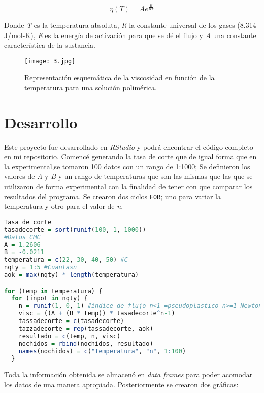 \documentclass{elsarticle}
\begin{document}
\begin{equation}
\eta(T) = Ae^{\frac{E}{RT}}
\end{equation}

Donde \textit{T} es la temperatura absoluta, \textit{R} la constante universal de los gases (8.314 J/mol-K), \textit{E} es la energ\'ia de activaci\'on para que se d\'e el flujo y \textit{A} una constante característica de la sustancia. 

\begin{figure}[htb!] %
    \centering
    \texttt{[image: 3.jpg]} %
    \caption{Representaci\'on esquem\'atica de la viscosidad en funci\'on de la temperatura para una soluci\'on polim\'erica.}
    \label{Figura 3}
\end{figure}\newpage

\section{Desarrollo}
Este proyecto fue desarrollado en \textit{RStudio} y podr\'a encontrar el c\'odigo completo en mi repositorio\cite{R15}.
Comenc\'e generando la tasa de corte que de igual forma que en la experimental,se tomaron 100 datos con un  rango de 1:1000; Se definieron los valores de \textit{A} y \textit{B} y un rango de temperaturas que son las mismas que las que se utilizaron de forma experimental con la finalidad de tener con que comparar los resultados del programa.
Se crearon dos ciclos \texttt{FOR}; uno para variar la temperatura y otro para el valor de \textit{n}.

\begin{lstlisting}[language=R, caption= Segmento de c\'odigo ciclos \texttt{FOR}.]
Tasa de corte
tasadecorte = sort(runif(100, 1, 1000))
#Datos CMC
A = 1.2606
B = -0.0211
temperatura = c(22, 30, 40, 50) #C
nqty = 1:5 #Cuantasn
aok = max(nqty) * length(temperatura)

for (temp in temperatura) {
  for (inpot in nqty) {
    n = runif(1, 0, 1) #indice de flujo n<1 =pseudoplastico n>=1 Newtoniano
    visc = ((A + (B * temp)) * tasadecorte^n-1)
    tassadecorte = c(tasadecorte)
    tazzadecorte = rep(tassadecorte, aok)
    resultado = c(temp, n, visc)
    nochidos = rbind(nochidos, resultado)
    names(nochidos) = c("Temperatura", "n", 1:100)
  }
\end{lstlisting}

Toda la informaci\'on obtenida se almacen\'o en \textit{data frames} para poder acomodar los datos de una manera apropiada.
Posteriormente se crearon dos gr\'aficas:
\end{document}
